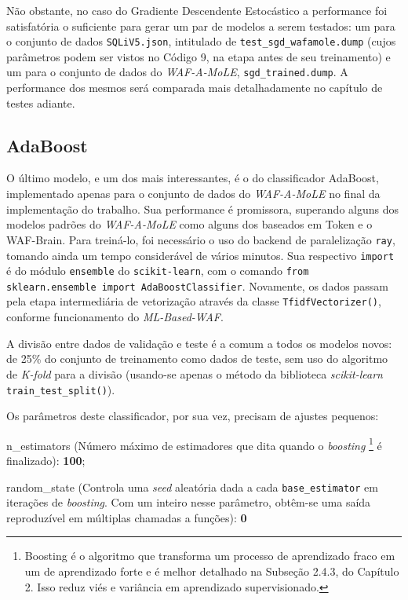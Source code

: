 Não obstante, no caso do Gradiente Descendente Estocástico a performance foi satisfatória o suficiente para gerar um par de modelos a serem testados: um para o conjunto de dados \verb+SQLiV5.json+, intitulado de \verb+test_sgd_wafamole.dump+ (cujos parâmetros podem ser vistos no Código 9, na etapa antes de seu treinamento) e um para o conjunto de dados do \textit{WAF-A-MoLE}, \verb+sgd_trained.dump+. A performance dos mesmos será comparada mais detalhadamente no capítulo de testes adiante. 

\label{sec:codigos:modelos}
\bigskip

\subsection{AdaBoost}

O último modelo, e um dos mais interessantes, é o do classificador AdaBoost, implementado apenas para o conjunto de dados do \textit{WAF-A-MoLE} no final da implementação do trabalho. Sua performance é promissora, superando alguns dos modelos padrões do \textit{WAF-A-MoLE} como alguns dos baseados em Token e o WAF-Brain. Para treiná-lo, foi necessário o uso do backend de paralelização \verb+ray+, tomando ainda um tempo considerável de vários minutos. Sua respectivo \verb+import+ é do módulo \verb+ensemble+ do \verb+scikit-learn+, com o comando \verb+from sklearn.ensemble import AdaBoostClassifier+. Novamente, os dados passam pela etapa intermediária de vetorização através da classe \verb+TfidfVectorizer()+, conforme funcionamento do \textit{ML-Based-WAF}. 

A divisão entre dados de validação e teste é a comum a todos os modelos novos: de 25\% do conjunto de treinamento como dados de teste, sem uso do algoritmo de \textit{K-fold} para a divisão (usando-se apenas o método da biblioteca \textit{scikit-learn} \verb+train_test_split()+).

Os parâmetros deste classificador, por sua vez, precisam de ajustes pequenos:
\begin{alineas}
\item n\_estimators (Número máximo de estimadores que dita quando o \textit{boosting} \footnote{Boosting é o algoritmo que transforma um processo de aprendizado fraco em um de aprendizado forte e é melhor detalhado na Subseção 2.4.3, do Capítulo 2. Isso reduz viés e variância em aprendizado supervisionado.} é finalizado): \textbf{100};
\item random\_state (Controla uma \textit{seed} aleatória dada a cada \verb+base_estimator+ em iterações de \textit{boosting}. Com um inteiro nesse parâmetro, obtêm-se uma saída reproduzível em múltiplas chamadas a funções): \textbf{0}
\end{alineas}


